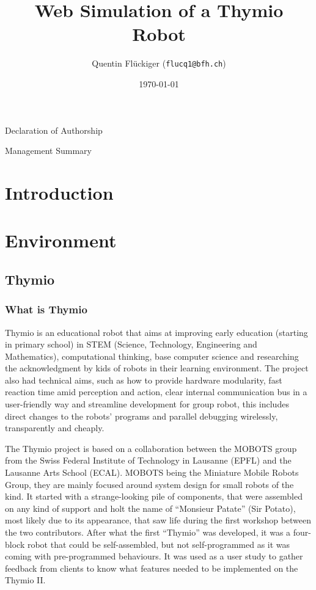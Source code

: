 \documentclass{scrartcl}
\begin{document}
\title{Web Simulation of a Thymio Robot}
\date{\today}   %
\author{Quentin Flückiger (\texttt{flucq1@bfh.ch})}





\maketitle
\clearpage

Declaration of Authorship
\clearpage
\clearpage

Management Summary
\clearpage
\clearpage

\tableofcontents
\clearpage

\section{Introduction}

\section{Environment}

\subsection{Thymio}
\subsubsection{What is Thymio} 

Thymio is an educational robot that aims at improving early education (starting in primary school) in STEM (Science, Technology, Engineering and Mathematics),
computational thinking, base computer science and researching the acknowledgment by kids of robots in their learning environment.
The project also had technical aims, such as how to provide hardware modularity, fast reaction time amid perception and action,
clear internal communication bus in a user-friendly way and streamline development for group robot, this includes direct changes to the robots’ programs and parallel debugging wirelessly, 
transparently and cheaply.

The Thymio project is based on a collaboration between the MOBOTS group from the Swiss Federal Institute of Technology in Lausanne (EPFL) and the Lausanne Arts School (ECAL).
MOBOTS being the Miniature Mobile Robots Group, they are mainly focused around system design for small robots of the kind. It started with a strange-looking pile of components, 
that were assembled on any kind of support and holt the name of “Monsieur Patate” (Sir Potato), most likely due to its appearance, 
that saw life during the first workshop between the two contributors. After what the first “Thymio” was developed, 
it was a four-block robot that could be self-assembled, but not self-programmed as it was coming with pre-programmed behaviours. 
It was used as a user study to gather feedback from clients to know what features needed to be implemented on the Thymio II.
\end{document}
